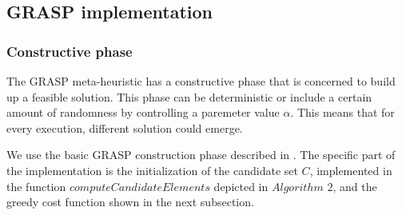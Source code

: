 \subsection{GRASP implementation}

\subsubsection{Constructive phase}

The GRASP meta-heuristic has a constructive phase that is concerned to build up a feasible solution. This phase can be deterministic or include a certain amount of randomness by controlling a paremeter value $\alpha$.  This means
that for every execution, different solution could emerge.






We use the basic GRASP construction phase described in \cite{grasp}. The specific part of the implementation is the initialization of the candidate set $C$, implemented in the function $computeCandidateElements$ depicted in $Algorithm$ $2$, and the greedy cost function shown in the next subsection.

